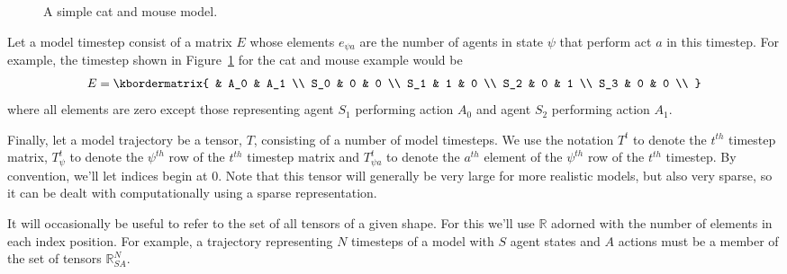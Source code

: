 \documentclass{article}
\begin{document}
\begin{figure}
	\centering
	\caption{A simple cat and mouse model.\label{fig:AB-MCMC-1}}
\end{figure}


Let a model timestep consist of a matrix $E$ whose elements $e_{\psi a}$ are the number of agents in state $\psi$ that perform act $a$ in this timestep. For example, the timestep shown in Figure~\ref{fig:AB-MCMC-1} for the cat and mouse example would be
\[
E = \kbordermatrix{
	& A_0 & A_1 \\
	S_0 & 0 & 0 \\
	S_1 & 1 & 0 \\
	S_2 & 0  & 1 \\
	S_3 & 0 & 0 \\
}
\]
where all elements are zero except those representing agent $S_1$ performing action $A_0$ and agent $S_2$ performing action $A_1$.

Finally, let a model trajectory be a tensor, $T$, consisting of a number of model timesteps. We use the notation $T^t$ to denote the $t^{th}$ timestep matrix, $T^t_\psi$ to denote the $\psi^{th}$ row of the $t^{th}$ timestep matrix and $T^t_{\psi a}$ to denote the $a^{th}$ element of the $\psi^{th}$ row of the $t^{th}$ timestep. By convention, we'll let indices begin at 0. Note that this tensor will generally be very large for more realistic models, but also very sparse, so it can be dealt with computationally using a sparse representation.

It will occasionally be useful to refer to the set of all tensors of a given shape. For this we'll use $\mathbb{R}$ adorned with the number of elements in each index position. For example, a trajectory representing $N$ timesteps of a model with $S$ agent states and $A$ actions must be a member of the set of tensors $\mathbb{R}^N_{SA}$.
\end{document}
